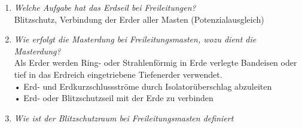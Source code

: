 \documentclass[12pt]{article}
\begin{document}
\begin{enumerate}
    \item \textit{Welche Aufgabe hat das Erdseil bei Freileitungen?}\\
    Blitzschutz, Verbindung der Erder aller Masten (Potenzialausgleich)
    \item \textit{Wie erfolgt die Masterdung bei Freileitungsmasten, 
    wozu dient die Masterdung?}\\
    Als Erder werden Ring- oder Strahlenförmig in Erde verlegte Bandeisen oder tief in das Erdreich eingetriebene 
    Tiefenerder verwendet. \\
    • Erd- und Erdkurzschlussströme durch Isolatorüberschlag abzuleiten\\
    • Erd- oder Blitzschutzseil mit der Erde zu verbinden\\
    \clearpage
    \item \textit{Wie ist der Blitzschutzraum bei Freileitungsmasten 
    definiert}\\
    

\end{enumerate}
\end{document}
